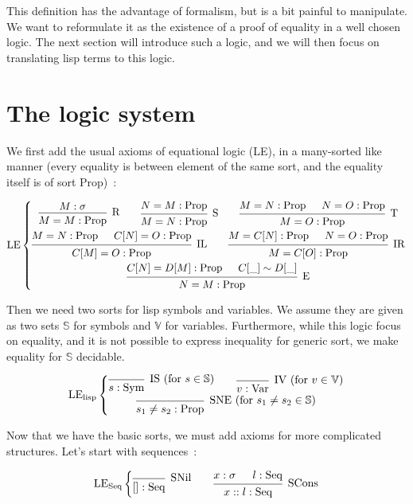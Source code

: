 \documentclass[]{article}
\newcommand{\V}{\mathscr{V}}
\newcommand{\1}{\mathbbm{1}}
\newcommand{\0}{\mathbbm{0}}
\renewcommand{\S}{\mathbb{S}}
\renewcommand{\V}{\mathbb{V}}
\newcommand{\Prop}{\text{Prop}}
\newcommand{\Sym}{\text{Sym}}
\newcommand{\Var}{\text{Var}}
\newcommand{\Seq}{\text{Seq}}
\newcommand{\proof}[1]{{\scantokens{\begin{prooftree}#1\end{prooftree}}}}
\begin{document}
This definition has the advantage of formalism, but is a bit painful to manipulate.
We want to reformulate it as the existence of a proof of equality in a well
chosen logic. The next section will introduce such a logic, and we will then focus
on translating lisp terms to this logic.

\section{The logic system}

We first add the usual axioms of equational logic (LE),
in a many-sorted like manner (every equality is between element
of the same sort, and the equality itself is of sort $\Prop$)~:

\[\text{LE}\left\{
\begin{gathered}
\proof{
    \hypo{M : \sigma}
    \infer1[R]{M = M : \Prop}
}
\qquad\proof{
    \hypo{ N = M : \Prop }
    \infer1[S]{M = N : \Prop}
}
\qquad\proof{
    \hypo{M= N : \Prop}
    \hypo{N= O : \Prop}
    \infer2[T]{M= O : \Prop}
} \\
\proof{
    \hypo{M= N:\Prop}
    \hypo{C[N]= O:\Prop}
    \infer2[IL]{C[M]= O : \Prop}
}
\qquad\proof{
    \hypo{M = C[N]:\Prop}
    \hypo{N = O:\Prop}
    \infer2[IR]{M = C[O]:\Prop}
} \\
\proof{
    \hypo{C[N]= D[M]:\Prop}
    \hypo{C[\_]\sim D[\_]}
    \infer2[E]{N= M:\Prop}
}
\end{gathered}
\right.
\]

Then we need two sorts for lisp symbols and variables. We assume they
are given as two sets $\S$ for symbols and $\V$ for variables.
Furthermore, while this logic focus on equality, and it is not possible
to express inequality for generic sort, we make equality for $\S$
decidable.

\[\text{LE}_\text{lisp}\left\{
    \begin{gathered}
        \proof{
            \infer0[IS (for $s\in\S$)]{s : \Sym}
        }
        \qquad\proof{
            \infer0[IV (for $v\in\V)$]{v : \Var}
        }\\
        \proof{
            \infer0[SNE (for $s_1\neq s_2\in\S$)]{s_1\neq s_2:\Prop}
        }
    \end{gathered}
\right.\]

Now that we have the basic sorts, we must add axioms for more complicated
structures. Let's start with sequences~:

\[\text{LE}_\text{Seq}\left\{
    \begin{gathered}
        \proof{
            \infer0[SNil]{[]:\Seq}
        }
        \qquad\proof{
            \hypo{x:\sigma}
            \hypo{l:\Seq}
            \infer2[SCons]{x::l : \Seq}
        }
    \end{gathered}
\right.\]
\end{document}
